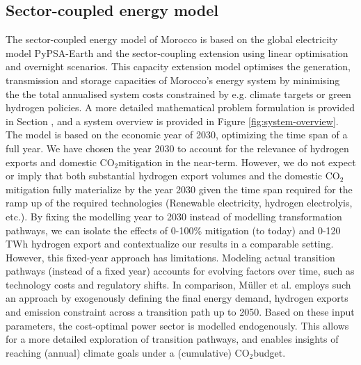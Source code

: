 \documentclass[5p,numafflabel]{elsarticle}
\newcommand{\co}{\ce{CO2}~}
\def\co{CO${}_2${\:}}
\begin{document}
\subsection*{Sector-coupled energy model}
\label{subsec:moroccan_model}
The sector-coupled energy model of Morocco is based on the global electricity model  PyPSA-Earth \cite{Parzen2023} and the sector-coupling extension \cite{Abdel-Khalek2024} using linear optimisation and overnight scenarios. This capacity extension model optimises the generation, transmission and storage capacities of Morocco's energy system by minimising the the total annualised system costs constrained by e.g. climate targets or green hydrogen policies.
A more detailed mathematical problem formulation is provided in Section , and a system overview is provided in Figure \ref{fig:system-overview}.
The model is based on the economic year of 2030, optimizing the time span of a full year. We have chosen the year 2030 to account for the relevance of hydrogen exports and domestic \co mitigation in the near-term. However, we do not expect or imply that both substantial hydrogen export volumes and the domestic \co mitigation fully materialize by the year 2030 given the time span required for the ramp up of the required technologies (Renewable electricity, hydrogen electrolyis, etc.). By fixing the modelling year to 2030 instead of modelling transformation pathways, we can isolate the effects of 0-100\% mitigation (to today) and 0-120 TWh hydrogen export and contextualize our results in a comparable setting.
However, this fixed-year approach has limitations. Modeling actual transition pathways (instead of a fixed year) accounts for evolving factors over time, such as technology costs and regulatory shifts. 
In comparison, M\"uller et al.\cite{Muller2024} employs such an  approach by exogenously defining the final energy demand, hydrogen exports and emission constraint across a transition path up to 2050. Based on these input parameters, the cost-optimal power sector is modelled endogenously. This allows for a more detailed exploration of transition pathways, and enables insights of reaching (annual) climate goals under a (cumulative) \co budget.
\end{document}
